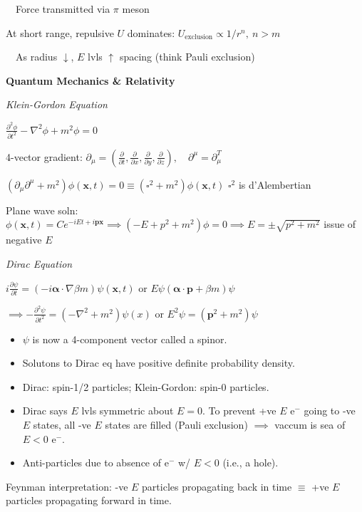 \documentclass[twocolumn]{article}
\begin{document}
$\quad$Force transmitted via $\pi$ meson

At short range, repulsive $U$ dominates: $U_{\text{exclusion}} \propto 1/r^n,\ n > m$

$\quad$As radius $\downarrow$, $E$ lvls $\uparrow$ spacing (think Pauli exclusion)

\vspace{-.5em}
\dotfill

\textbf{Quantum Mechanics \& Relativity}

\textit{Klein-Gordon Equation}

$\frac{\partial^2 \phi}{\partial t^2} - \nabla^2 \phi + m^2 \phi = 0$

4-vector gradient: $\partial_\mu = \left( \frac{\partial}{\partial t}, \frac{\partial}{\partial x}, \frac{\partial}{\partial y}, \frac{\partial}{\partial z} \right), \quad \partial^\mu = \partial_\mu^T$

$(\partial_\mu \partial^\mu + m^2) \phi(\mathbf x, t) = 0 \equiv (\square^2 + m^2) \phi(\mathbf x, t)$ \hfill $\square^2$ is d'Alembertian

Plane wave soln: $\phi(\mathbf x, t) = Ce^{-iEt+i\mathbf p \mathbf x} \implies (-E + p^2 + m^2) \phi = 0 \implies E = \pm \sqrt{p^2+m^2}$ \hfill issue of negative $E$

\vspace{-.5em}
\dotfill

\textit{Dirac Equation}

$i \frac{\partial \psi}{\partial t} = (-i \boldsymbol \alpha \cdot \nabla \beta m) \psi(\mathbf x, t)$ or $E \psi (\boldsymbol \alpha \cdot \mathbf p + \beta m) \psi$

$\implies -\frac{\partial^2 \psi}{\partial t^2} = (-\nabla^2 + m^2) \psi(x)$ or $E^2 \psi = (\mathbf p^2 + m^2) \psi$

\begin{itemize}
    \item $\psi$ is now a 4-component vector called a spinor.
    \item Solutons to Dirac eq have positive definite probability density.
    \item Dirac: spin-1/2 particles; Klein-Gordon: spin-0 particles.
    \item Dirac says $E$ lvls symmetric about $E=0$. To prevent +ve $E$ e$^-$ going to -ve $E$ states, all -ve $E$ states are filled (Pauli exclusion) $\implies$ vaccum is sea of $E < 0$ e$^-$.
    \item Anti-particles due to absence of e$^-$ w/ $E < 0$ (i.e., a hole).
\end{itemize} \vspace{-.5em}

Feynman interpretation: -ve $E$ particles propagating back in time $\equiv$ +ve $E$ particles propagating forward in time.
\end{document}
